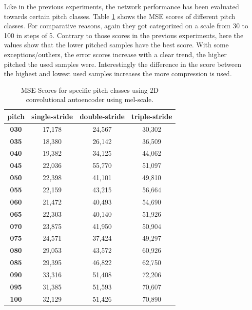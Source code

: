 Like in the previous experiments, the network performance has been evaluated towards certain pitch classes. Table \ref{tab:res_scores_2D_pitch_mel} shows the MSE scores of different pitch classes. For comparative reasons, again they got categorized on a scale from 30 to 100 in steps of 5. Contrary to those scores in the previous experiments, here the values show that the lower pitched samples have the best score. With some exceptions/outliers, the error scores increase with a clear trend, the higher pitched the used samples were. Interestingly the difference in the score between the highest and lowest used samples increases the more compression is used. 

\begin{table}[htb!]
\centering
\begin{tabular}{|c|c|c|c|}
\hline
\textbf{pitch} & \textbf{single-stride} & \textbf{double-stride} & \textbf{triple-stride} \\ \hline
\textbf{030}   & 17,178                 & 24,567                 & 30,302                 \\ \hline
\textbf{035}   & 18,380                 & 26,142                 & 36,509                 \\ \hline
\textbf{040}   & 19,382                 & 34,125                 & 44,062                 \\ \hline
\textbf{045}   & 22,036                 & 55,770                 & 51,097                 \\ \hline
\textbf{050}   & 22,398                 & 41,101                 & 49,810                 \\ \hline
\textbf{055}   & 22,159                 & 43,215                 & 56,664                 \\ \hline
\textbf{060}   & 21,472                 & 40,493                 & 54,690                 \\ \hline
\textbf{065}   & 22,303                 & 40,140                 & 51,926                 \\ \hline
\textbf{070}   & 23,875                 & 41,950                 & 50,904                 \\ \hline
\textbf{075}   & 24,571                 & 37,424                 & 49,297                 \\ \hline
\textbf{080}   & 29,053                 & 43,572                 & 60,926                 \\ \hline
\textbf{085}   & 29,395                 & 46,822                 & 62,750                 \\ \hline
\textbf{090}   & 33,316                 & 51,408                 & 72,206                 \\ \hline
\textbf{095}   & 31,385                 & 51,593                 & 70,607                 \\ \hline
\textbf{100}   & 32,129                 & 51,426                 & 70,890                 \\ \hline
\end{tabular}
\caption{MSE-Scores for specific pitch classes using 2D convolutional autoencoder using mel-scale.}
\label{tab:res_scores_2D_pitch_mel}
\end{table}

